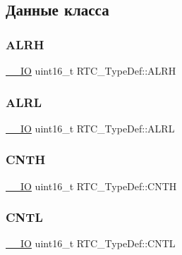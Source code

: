 \subsection{Данные класса}
\mbox{\label{struct_r_t_c___type_def_a873ee28923e732677a3a58971bdc9e6b}} 
\subsubsection{\texorpdfstring{ALRH}{ALRH}}
{\footnotesize\ttfamily \mbox{\hyperlink{group___c_m_s_i_s___c_m3__core__definitions_gaec43007d9998a0a0e01faede4133d6be}{\+\_\+\+\_\+\+IO}} uint16\+\_\+t R\+T\+C\+\_\+\+Type\+Def\+::\+A\+L\+RH}

\mbox{\label{struct_r_t_c___type_def_afea5d3abb40323a5385cf461094c06d3}} 
\subsubsection{\texorpdfstring{ALRL}{ALRL}}
{\footnotesize\ttfamily \mbox{\hyperlink{group___c_m_s_i_s___c_m3__core__definitions_gaec43007d9998a0a0e01faede4133d6be}{\+\_\+\+\_\+\+IO}} uint16\+\_\+t R\+T\+C\+\_\+\+Type\+Def\+::\+A\+L\+RL}

\mbox{\label{struct_r_t_c___type_def_a094741bcc8fca018b500f7468531f0ef}} 
\subsubsection{\texorpdfstring{CNTH}{CNTH}}
{\footnotesize\ttfamily \mbox{\hyperlink{group___c_m_s_i_s___c_m3__core__definitions_gaec43007d9998a0a0e01faede4133d6be}{\+\_\+\+\_\+\+IO}} uint16\+\_\+t R\+T\+C\+\_\+\+Type\+Def\+::\+C\+N\+TH}

\mbox{\label{struct_r_t_c___type_def_a212cb62d18ce312bc3f69641aa76688d}} 
\subsubsection{\texorpdfstring{CNTL}{CNTL}}
{\footnotesize\ttfamily \mbox{\hyperlink{group___c_m_s_i_s___c_m3__core__definitions_gaec43007d9998a0a0e01faede4133d6be}{\+\_\+\+\_\+\+IO}} uint16\+\_\+t R\+T\+C\+\_\+\+Type\+Def\+::\+C\+N\+TL}


